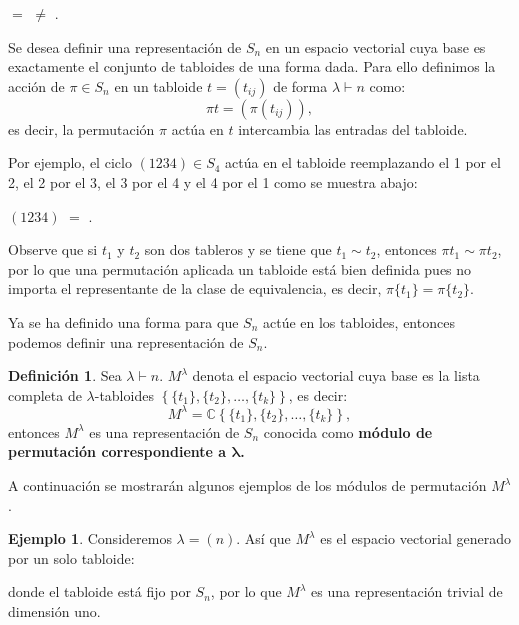 \documentclass[12pt]{book}
\theoremstyle{definition}
\newtheorem{definition}[theorem]{Definición}
\newtheorem{example}[theorem]{Ejemplo}
\newcounter{in}
\newcounter{ini}
\begin{document}
\begin{center}
  \quad$=$\quad
  \quad$\neq$\quad
  \quad .
\end{center}

Se desea definir una representación de $S_{n}$ en un espacio vectorial
cuya base es exactamente el conjunto de tabloides de una forma
dada. Para ello definimos la acción de $\pi \in S_{n}$ en un tabloide
$t = (t_{ij})$ de forma $\lambda\vdash n$ como:
$$\pi t = (\pi (t_{ij})),$$
es decir, la permutación $\pi$ actúa en $t$ intercambia las entradas
del tabloide.

Por ejemplo, el ciclo $(1234)\in S_{4}$ actúa en el tabloide
reemplazando el 1 por el 2, el 2 por el 3, el 3 por el 4 y el 4 por el
1 como se muestra abajo:
\begin{center}
 \label{eje_nec}
  $(1234)$
  \quad$=$\quad
  \quad .
\end{center}

Observe que  si $t_{1}$ y $t_{2}$ son dos tableros y se tiene que $t_{1} \sim t_{2}$, entonces $\pi t_{1} \sim \pi t_{2}$, por lo que una permutación aplicada un tabloide está bien definida pues no importa el representante de la clase de equivalencia, es decir, $\pi \{t_{1}\}= \pi \{t_{2}\}$.

Ya se ha definido una forma para que $S_{n}$ actúe en los tabloides,
entonces podemos definir una representación de $S_{n}$.

\begin{definition}
  Sea $\lambda\vdash n$. $M^{\lambda}$ denota el espacio vectorial
  cuya base es la lista completa de $\lambda$-tabloides $\left \{ \{t_{1}\}, \{t_{2}\}, \ldots, \{t_{k}\} \right \}$, es decir:
  $$ M^{\lambda} = \mathbb{C} \left \{ \{t_{1}\}, \{t_{2}\}, \ldots, \{t_{k}\} \right \},$$
  entonces $M^{\lambda}$ es una representación de $S_{n}$ conocida como \textbf{módulo
  de permutación correspondiente a $\boldsymbol{\lambda}$.}
\end{definition}

A continuación se mostrarán algunos ejemplos de los módulos de
permutación $M^{\lambda}$. 

\begin{example}
  Consideremos $\lambda=(n)$. Así que $M^{\lambda}$ es el espacio
  vectorial generado por un solo tabloide:
  \begin{center}
  \end{center}
donde el tabloide está fijo por $S_{n}$, por lo que $M^{\lambda}$ es
una representación trivial de dimensión uno.
\end{example}
\end{document}
